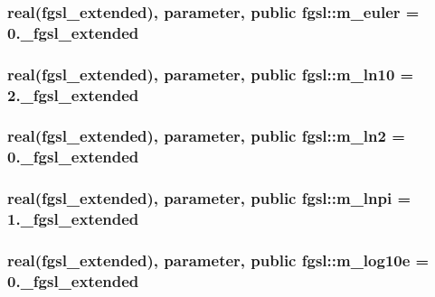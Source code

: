 \hypertarget{classfgsl_ab8079b9a6e17b1def176e97feda2a841}{
\subsubsection[{m\-\_\-euler}]{\setlength{\rightskip}{0pt plus 5cm}real({\bf fgsl\-\_\-extended}), parameter, public fgsl\-::m\-\_\-euler = 0.\-\_\-fgsl\-\_\-extended}}\label{classfgsl_ab8079b9a6e17b1def176e97feda2a841}
\hypertarget{classfgsl_a152b62af261c671c54b99ac278df759d}{
\subsubsection[{m\-\_\-ln10}]{\setlength{\rightskip}{0pt plus 5cm}real({\bf fgsl\-\_\-extended}), parameter, public fgsl\-::m\-\_\-ln10 = 2.\-\_\-fgsl\-\_\-extended}}\label{classfgsl_a152b62af261c671c54b99ac278df759d}
\hypertarget{classfgsl_a126c02aa2554290ff648243425e03ace}{
\subsubsection[{m\-\_\-ln2}]{\setlength{\rightskip}{0pt plus 5cm}real({\bf fgsl\-\_\-extended}), parameter, public fgsl\-::m\-\_\-ln2 = 0.\-\_\-fgsl\-\_\-extended}}\label{classfgsl_a126c02aa2554290ff648243425e03ace}
\hypertarget{classfgsl_ae9aff58d6fcadaab60410424796cd713}{
\subsubsection[{m\-\_\-lnpi}]{\setlength{\rightskip}{0pt plus 5cm}real({\bf fgsl\-\_\-extended}), parameter, public fgsl\-::m\-\_\-lnpi = 1.\-\_\-fgsl\-\_\-extended}}\label{classfgsl_ae9aff58d6fcadaab60410424796cd713}
\hypertarget{classfgsl_a64dfb3018d641c61312823bf56c85023}{
\subsubsection[{m\-\_\-log10e}]{\setlength{\rightskip}{0pt plus 5cm}real({\bf fgsl\-\_\-extended}), parameter, public fgsl\-::m\-\_\-log10e = 0.\-\_\-fgsl\-\_\-extended}}\label{classfgsl_a64dfb3018d641c61312823bf56c85023}

